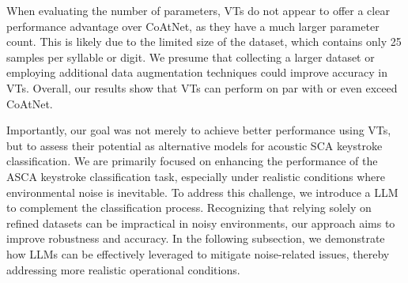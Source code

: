 \par
When evaluating the number of parameters, VTs do not appear to offer a clear performance advantage over CoAtNet, as they have a much larger parameter count. This is likely due to the limited size of the dataset, which contains only 25 samples per syllable or digit. We presume that collecting a larger dataset or employing additional data augmentation techniques could improve accuracy in VTs. Overall, our results show that VTs can perform on par with or even exceed CoAtNet. 
\par
Importantly, our goal was not merely to achieve better performance using VTs, but to assess their potential as alternative models for acoustic SCA keystroke classification. We are primarily focused on enhancing the performance of the ASCA keystroke classification task, especially under realistic conditions where environmental noise is inevitable. To address this challenge, we introduce a LLM to complement the classification process. Recognizing that relying solely on refined datasets can be impractical in noisy environments, our approach aims to improve robustness and accuracy. In the following subsection, we demonstrate how LLMs can be effectively leveraged to mitigate noise-related issues, thereby addressing more realistic operational conditions.

